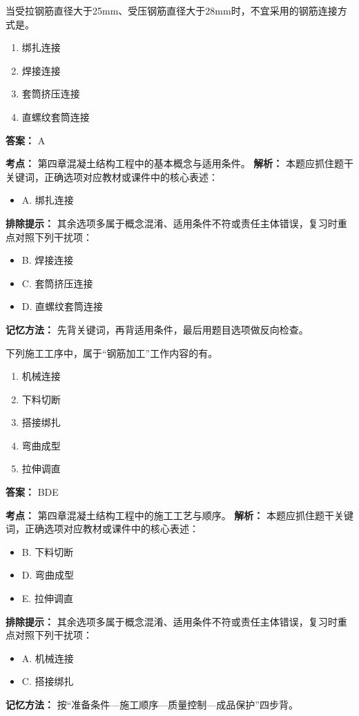 \documentclass[UTF8,fontset=fandol,11pt]{ctexart}
\begin{document}
\begin{quizbox}[title={第 20 题}]
当受拉钢筋直径大于25mm、受压钢筋直径大于28mm时，不宜采用的钢筋连接方式是。\\
\begin{enumerate}[label=\Alph*.]
\item 绑扎连接
\item 焊接连接
\item 套筒挤压连接
\item 直螺纹套筒连接
\end{enumerate}
\textbf{答案：} A
\vspace{0.25em}
\begin{answerbox}[title={考点解析}]
\textbf{考点：} 第四章混凝土结构工程中的基本概念与适用条件。
\textbf{解析：} 本题应抓住题干关键词，正确选项对应教材或课件中的核心表述：
\begin{itemize}
\item A. 绑扎连接
\end{itemize}
\textbf{排除提示：} 其余选项多属于概念混淆、适用条件不符或责任主体错误，复习时重点对照下列干扰项：
\begin{itemize}
\item B. 焊接连接
\item C. 套筒挤压连接
\item D. 直螺纹套筒连接
\end{itemize}
\textbf{记忆方法：} 先背关键词，再背适用条件，最后用题目选项做反向检查。
\end{answerbox}
\end{quizbox}

\begin{quizbox}[title={第 21 题}]
下列施工工序中，属于“钢筋加工”工作内容的有。\\
\begin{enumerate}[label=\Alph*.]
\item 机械连接
\item 下料切断
\item 搭接绑扎
\item 弯曲成型
\item 拉伸调直
\end{enumerate}
\textbf{答案：} BDE
\vspace{0.25em}
\begin{answerbox}[title={考点解析}]
\textbf{考点：} 第四章混凝土结构工程中的施工工艺与顺序。
\textbf{解析：} 本题应抓住题干关键词，正确选项对应教材或课件中的核心表述：
\begin{itemize}
\item B. 下料切断
\item D. 弯曲成型
\item E. 拉伸调直
\end{itemize}
\textbf{排除提示：} 其余选项多属于概念混淆、适用条件不符或责任主体错误，复习时重点对照下列干扰项：
\begin{itemize}
\item A. 机械连接
\item C. 搭接绑扎
\end{itemize}
\textbf{记忆方法：} 按“准备条件—施工顺序—质量控制—成品保护”四步背。
\end{answerbox}
\end{quizbox}
\end{document}
